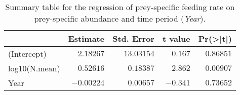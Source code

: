\begin{table}[!htbp]
\caption{Summary table for the regression of 
  prey-specific feeding rate 
  on prey-specific abundance and time period (\emph{Year}).\label{tab:FNY}} 
\begin{center}
\begin{tabular}{lrrrr}
\hline
\multicolumn{1}{l}{}&\multicolumn{1}{c}{Estimate}&\multicolumn{1}{c}{Std. Error}&\multicolumn{1}{c}{t value}&\multicolumn{1}{c}{Pr(\textgreater |t|)}\tabularnewline
\hline
(Intercept)&$ 2.18267$&$13.03154$&$ 0.167$&$0.86851$\tabularnewline
log10(N.mean)&$ 0.52616$&$ 0.18387$&$ 2.862$&$0.00907$\tabularnewline
Year&$-0.00224$&$ 0.00657$&$-0.341$&$0.73652$\tabularnewline
\hline
\end{tabular}\end{center}
\end{table}
